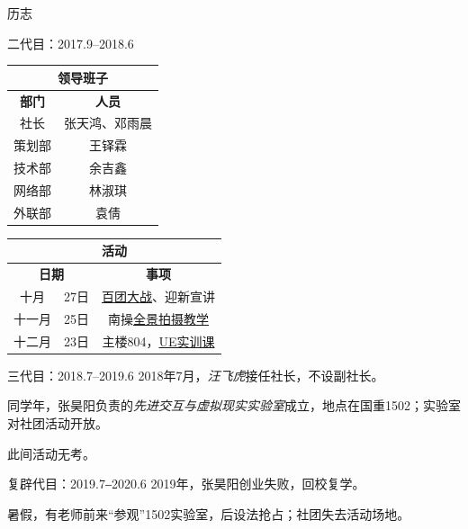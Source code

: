 \documentclass{paper}
\newcommand{\name}[1]{{\em #1}}
\renewcommand{\thead}[1]{\textbf{ #1}}
\begin{document}
\begin{section}{历志}
\begin{subsection}{二代目：2017.9--2018.6}
		\begin{table}[H]\begin{center}
			\begin{tabular}{|c|c|}
				\hline
				\multicolumn{2}{|c|}{\thead{领导班子}} \\ \hline
				\thead{部门} & \thead{人员} \\ \hline
				社长 & 张天鸿、邓雨晨 \\ \hline
				策划部 & 王铎霖 \\ \hline
				技术部 & 余吉鑫 \\ \hline
				网络部 & 林淑琪 \\ \hline
				外联部 & 袁倩 \\ \hline
			\end{tabular}
		\end{center}\end{table}

		\begin{table}[H]\begin{center}
			\begin{tabular}{|c|c|c|}
				\hline
				\multicolumn{3}{|c|}{\thead{活动}} \\ \hline
				\multicolumn{2}{|c|}{\thead{日期}} & \thead{事项} \\ \hline
				\multirow{1}{*}{十月} & 27日 & \href{https://mp.weixin.qq.com/s/oqxBqJkMci10MyT-Lh4Nbw}{百团大战}、迎新宣讲 \\ \hline
				\multirow{1}{*}{十一月} & 25日 & 南操\href{https://mp.weixin.qq.com/s/dy4ZUS6qMgGBnK28GFHBDA}{全景拍摄教学} \\ \hline
				\multirow{1}{*}{十二月} & 23日 & 主楼804，\href{https://mp.weixin.qq.com/s/1NMEYBLSlib-6M-JBOz28g}{UE实训课} \\ \hline
			\end{tabular}
		\end{center}\end{table}
	\end{subsection}
	\begin{subsection}{三代目：2018.7--2019.6}
		2018年7月，\name{汪飞虎}接任社长，不设副社长。

		同学年，张昊阳负责的\name{先进交互与虚拟现实实验室}成立，地点在国重1502；实验室
		对社团活动开放。

		此间活动无考。
	\end{subsection}
	\begin{subsection}{复辟代目：2019.7‒2020.6}
		2019年，张昊阳创业失败，回校复学。

		暑假，有老师前来“参观”1502实验室，后设法抢占；社团失去活动场地。


\end{subsection}
\end{section}
\end{document}
